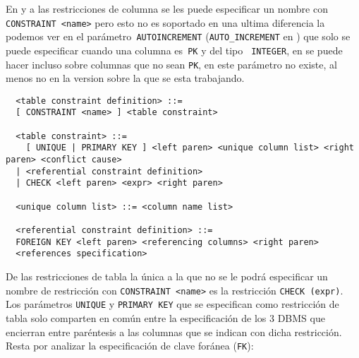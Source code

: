 En \s y \p a las restricciones de columna se les puede especificar un nombre con \verb=CONSTRAINT <name>= pero esto no es soportado en \m una ultima diferencia la podemos ver en el parámetro\verb= AUTOINCREMENT= (\verb=AUTO_INCREMENT= en \m) que solo se puede especificar cuando una columna es\verb= PK= y del tipo \verb= INTEGER=, en \m se puede hacer incluso sobre columnas que no sean \verb=PK=, en \p este parámetro no existe, al menos no en la version  sobre la que se esta trabajando.  

\begin{Verbatim}
  <table constraint definition> ::=
  [ CONSTRAINT <name> ] <table constraint>

  <table constraint> ::=
    [ UNIQUE | PRIMARY KEY ] <left paren> <unique column list> <right paren> <conflict cause>
  | <referential constraint definition>
  | CHECK <left paren> <expr> <right paren>

  <unique column list> ::= <column name list>

  <referential constraint definition> ::=
  FOREIGN KEY <left paren> <referencing columns> <right paren>
  <references specification>
\end{Verbatim}

De las restricciones de tabla la única a la que no se le podrá especificar un nombre de restricción con \verb=CONSTRAINT <name>= es la restricción \verb=CHECK (expr)=. Los parámetros \verb=UNIQUE= y \verb=PRIMARY KEY= que se especifican como restricción de tabla solo comparten en común entre la especificación de los 3 DBMS que encierran entre paréntesis a las columnas que se indican con dicha restricción. Resta por analizar la especificación de clave foránea (\verb=FK=):    

